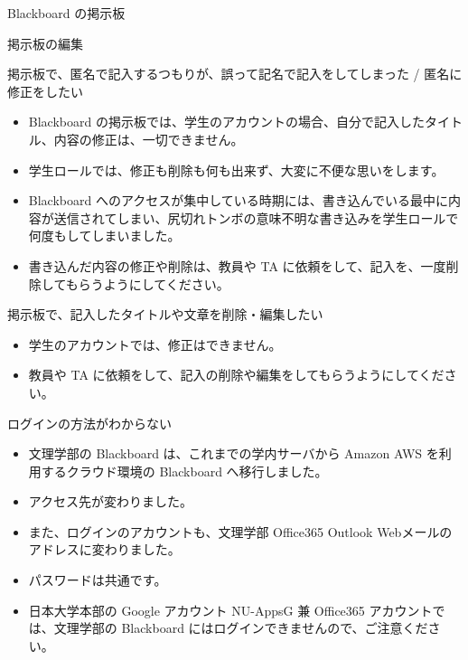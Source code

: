 \documentclass[a4j,10pt]{jsarticle}
\def\lthtmlcheckvsize{\ifdim\ht\sizebox<\vsize 
  \ifdim\wd\sizebox<\hsize\expandafter\hfill\fi \expandafter\vfill
  \else\expandafter\vss\fi}%
\begin{document}
{\newpage\clearpage
{}%
\begin{frame}[label={sec:org56c3454},fragile]{Blackboard の掲示板}
\begin{block}{掲示板の編集}
\begin{block}{掲示板で、匿名で記入するつもりが、誤って記名で記入をしてしまった / 匿名に修正をしたい}
\begin{itemize}
\item Blackboard の掲示板では、学生のアカウントの場合、自分で記入したタイトル、内容の修正は、一切できません。
\item 学生ロールでは、修正も削除も何も出来ず、大変に不便な思いをします。
\item Blackboard へのアクセスが集中している時期には、書き込んでいる最中に内容が送信されてしまい、尻切れトンボの意味不明な書き込みを学生ロールで何度もしてしまいました。
\item 書き込んだ内容の修正や削除は、教員や TA に依頼をして、記入を、一度削除してもらうようにしてください。
\end{itemize}
\end{block}
\par
\begin{block}{掲示板で、記入したタイトルや文章を削除・編集したい}
\begin{itemize}
\item 学生のアカウントでは、修正はできません。
\item 教員や TA に依頼をして、記入の削除や編集をしてもらうようにしてください。
\end{itemize}
\end{block}
\par
\begin{block}{ログインの方法がわからない}
\begin{itemize}
\item 文理学部の Blackboard は、これまでの学内サーバから Amazon AWS を利用するクラウド環境の Blackboard へ移行しました。
\item アクセス先が変わりました。
\item また、ログインのアカウントも、文理学部 Office365 Outlook Webメールのアドレスに変わりました。
\item パスワードは共通です。
\item 日本大学本部の Google アカウント NU-AppsG 兼 Office365 アカウントでは、文理学部の Blackboard にはログインできませんので、ご注意ください。
\end{itemize}
\end{block}
\end{block}
\end{frame}%
\lthtmlfigureZ
\lthtmlcheckvsize\clearpage}
\end{document}

